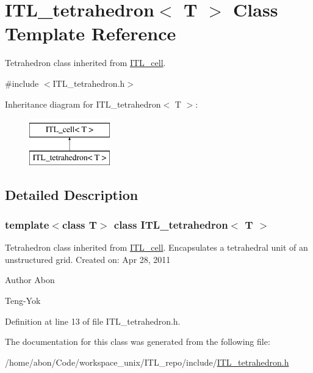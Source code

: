 \hypertarget{classITL__tetrahedron}{
\section{ITL\_\-tetrahedron$<$ T $>$ Class Template Reference}
\label{classITL__tetrahedron}
}


Tetrahedron class inherited from \hyperlink{classITL__cell}{ITL\_\-cell}.  




{\ttfamily \#include $<$ITL\_\-tetrahedron.h$>$}

Inheritance diagram for ITL\_\-tetrahedron$<$ T $>$:\begin{figure}[H]
\begin{center}
\leavevmode
\includegraphics[height=2cm]{classITL__tetrahedron}
\end{center}
\end{figure}


\subsection{Detailed Description}
\subsubsection*{template$<$class T$>$ class ITL\_\-tetrahedron$<$ T $>$}

Tetrahedron class inherited from \hyperlink{classITL__cell}{ITL\_\-cell}. Encapsulates a tetrahedral unit of an unstructured grid. Created on: Apr 28, 2011 \begin{DoxyAuthor}{Author}
Abon 

Teng-\/Yok 
\end{DoxyAuthor}


Definition at line 13 of file ITL\_\-tetrahedron.h.



The documentation for this class was generated from the following file:\begin{DoxyCompactItemize}
\item 
/home/abon/Code/workspace\_\-unix/ITL\_\-repo/include/\hyperlink{ITL__tetrahedron_8h}{ITL\_\-tetrahedron.h}\end{DoxyCompactItemize}
